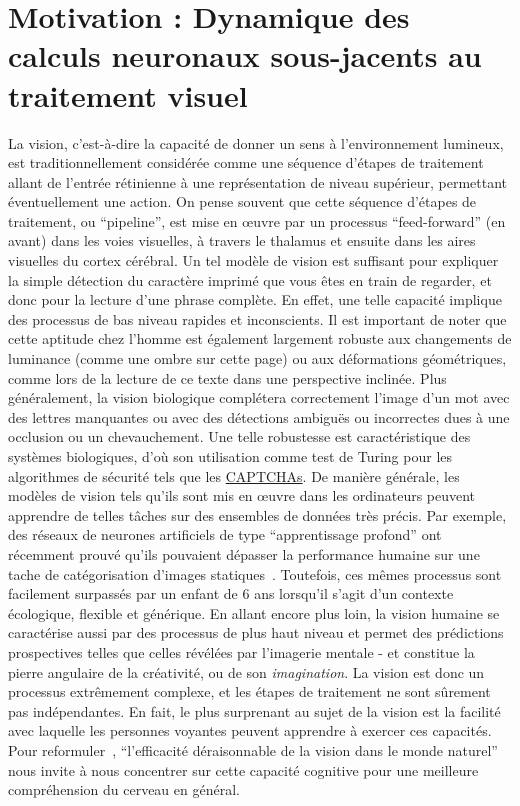 \section{Motivation : Dynamique des calculs neuronaux
sous-jacents au traitement
visuel}
La vision, c'est-à-dire la capacité de donner un sens à l'environnement
lumineux, est traditionnellement considérée comme une séquence d'étapes
de traitement allant de l'entrée rétinienne à une représentation de
niveau supérieur, permettant éventuellement une action. On pense souvent que cette séquence d'étapes de
traitement, ou ``pipeline'', est mise en œuvre par un
processus ``feed-forward'' (en avant) dans les voies visuelles, à travers le thalamus
et ensuite dans les aires visuelles du cortex cérébral. Un tel modèle de
vision est suffisant pour expliquer la simple détection du caractère
imprimé que vous êtes en train de regarder, et donc pour la lecture
d'une phrase complète. En effet, une telle capacité implique des
processus de bas niveau rapides et inconscients. Il est important de
noter que cette aptitude chez l'homme est également largement robuste
aux changements de luminance (comme une ombre sur cette page) ou
aux déformations géométriques, comme lors de la lecture de ce
texte dans une perspective inclinée. Plus généralement, la vision biologique
complétera correctement l'image d'un mot avec des lettres manquantes ou
avec des détections ambiguës ou incorrectes dues à une occlusion ou un
chevauchement. Une telle robustesse est caractéristique des systèmes
biologiques, d'où son utilisation comme test de Turing pour les
algorithmes de sécurité tels que les
\href{https://fr.m.wikipedia.org/wiki/CAPTCHA}{CAPTCHAs}.
De manière générale, les modèles de vision tels qu'ils sont mis en œuvre dans les ordinateurs
peuvent apprendre de telles tâches sur des
ensembles de données très précis.
Par exemple, des réseaux de neurones artificiels de type ``apprentissage profond'' ont récemment prouvé qu'ils pouvaient dépasser la performance humaine sur une tache de catégorisation d'images statiques~\citep{NIPS2012_4824}. %
Toutefois, ces mêmes processus sont facilement surpassés par un
enfant de 6 ans lorsqu'il s'agit d'un contexte écologique, flexible et
générique. En allant encore plus loin, la vision humaine se caractérise
aussi par des processus de plus haut niveau et permet des prédictions
prospectives telles que celles révélées par l'imagerie mentale - et
constitue la pierre angulaire de la créativité, ou de
son \emph{imagination}. La vision est donc un processus
extrêmement complexe, et les étapes de traitement ne sont sûrement pas indépendantes. %
En fait, le plus surprenant au sujet de la vision est la
facilité avec laquelle les personnes voyantes peuvent apprendre à exercer ces
capacités. Pour reformuler~\citet{Wigner90}, ``l'efficacité déraisonnable de
la vision dans le monde naturel'' nous invite à nous concentrer sur cette
capacité cognitive pour une meilleure compréhension du cerveau en
général.

